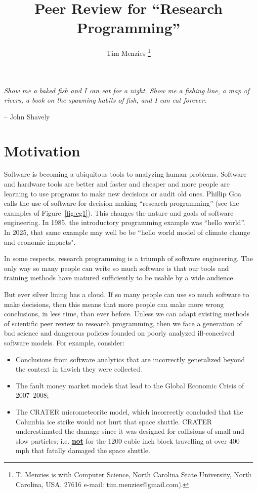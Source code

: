 \documentclass[journal]{IEEEtran}
\newcommand{\bi}{\begin{itemize}}
\newcommand{\ei}{\end{itemize}}
\begin{document}
 
\title{Peer Review  for ``Research Programming''}%
\author{Tim Menzies%
\thanks{T. Menzies is with Computer Science,
North Carolina State University, North Carolina, USA, 27616 e-mail: tim.menzies@gmail.com).}%
}%
 
\maketitle
 
 {\em Show me a baked fish and I can eat for a night. Show me a fishing line, a map of rivers, a book on the spawning habits
 of fish, and I can eat forever.  
 
 -- John Shavely}
 

  
   
 \section{Motivation}





Software is becoming  a ubiquitous tools
to analyzing human problems. 
Software and hardware tools
are  better and faster and cheaper and   more people  are learning to use programs to make new decisions or audit old ones. 
Phillip Goa~\cite{goa12} calls the use of software for 
decision making ``research programming'' (see the
examples of Figure~\ref{fig:eg1}).
This changes the nature and goals of software engineering.
In 1985, the introductory programming example was ``hello world''.  
In 2025, that same example
may well be be ``hello world model of climate change and economic
impacts". 


In some respects,  research programming is a triumph of software engineering.
The only way so many people can write so much software is that   our  tools and training methods have matured sufficiently to be usable by a wide audience.  
 
But ever silver lining has a cloud. If so many people can use so much software to make decisions, then this means that more
people can make more wrong conclusions, in less time, than
ever before. Unless we can adapt existing methods of scientific peer review to research programming, then we face a generation of bad science and dangerous  policies founded on  poorly analyzed ill-conceived software models. For
example, consider:
\bi
\item Conclusions from software analytics that
are incorrectly generalized beyond the context in thwich they were collected.
\item
The fault money market models that lead to the Global Economic Crisis of 2007--2008;
\item
The CRATER  micrometeorite  model, which  incorrectly
concluded that the Columbia  ice strike would not hurt that space shuttle. CRATER underestimated the damage since it was designed for  collisions of small and slow particles; i.e. \underline{{\bf not}} for  the 1200 cubic inch block travelling at over 400 mph that
fatally damaged  the space shuttle. 
\ei
\end{document}
